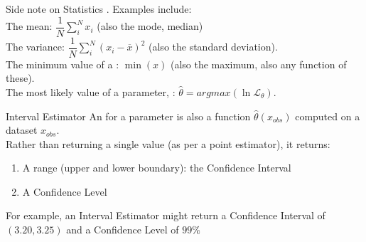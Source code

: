 \documentclass[10pt,sans,english,compress,xcolor=dvipsnames]{beamer}
\begin{document}
\begin{frame}{Side note on Statistics}
\footnotesize
{}. Examples include:\\[1ex]

The  mean: $\dfrac{1}{N} \sum\limits_i^N x_i $ (also the mode, median)\\[1ex]

The  variance: $\dfrac{1}{N} \sum\limits_i^N (x_i-\overline{x})^2 $ (also the standard deviation).\\[1ex]

The minimum value of a : $\min(x)$ (also the maximum, also any function of these).\\[1ex]

The most likely value of a parameter, : $\hat{\theta} = argmax(\ln{\mathcal{L}_{\theta}})$.\\[1ex]


\end{frame} 


\begin{frame}{Interval Estimator}
\footnotesize
An  for a parameter is also a function $\hat{\theta}(x_{obs})$ computed on a dataset $x_{obs}$. \\

Rather than returning a single value (as per a point estimator), it returns:
\begin{enumerate}
\item A range (upper and lower boundary): the Confidence Interval \\
\item A Confidence Level\\[1ex]
\end{enumerate}
\vspace{0.5cm}

For example, an Interval Estimator might return a Confidence Interval of $(3.20, 3.25)$ and a Confidence Level of $99\%$\magt{*} \\

\\

\end{frame} 
\end{document}
